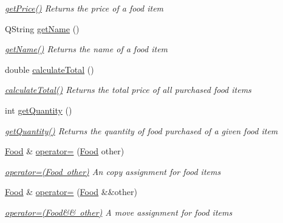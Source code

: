 \begin{DoxyCompactItemize}
\begin{DoxyCompactList}\small\item\em \mbox{\hyperlink{class_food_a16683d009125620dd07432fbe7711597}{get\+Price()}} Returns the price of a food item \end{DoxyCompactList}\item 
Q\+String \mbox{\hyperlink{class_food_a5652293c23e8b797d363c08efc585601}{get\+Name}} ()
\begin{DoxyCompactList}\small\item\em \mbox{\hyperlink{class_food_a5652293c23e8b797d363c08efc585601}{get\+Name()}} Returns the name of a food item \end{DoxyCompactList}\item 
double \mbox{\hyperlink{class_food_ac50c1e254e20ffeda0d28f84e1cc2160}{calculate\+Total}} ()
\begin{DoxyCompactList}\small\item\em \mbox{\hyperlink{class_food_ac50c1e254e20ffeda0d28f84e1cc2160}{calculate\+Total()}} Returns the total price of all purchased food items \end{DoxyCompactList}\item 
int \mbox{\hyperlink{class_food_ac05d435166d85ee4e7022e98f91f76d7}{get\+Quantity}} ()
\begin{DoxyCompactList}\small\item\em \mbox{\hyperlink{class_food_ac05d435166d85ee4e7022e98f91f76d7}{get\+Quantity()}} Returns the quantity of food purchased of a given food item \end{DoxyCompactList}\item 
\mbox{\hyperlink{class_food}{Food}} \& \mbox{\hyperlink{class_food_abe2267ba02f1b812c71028f427d92d81}{operator=}} (\mbox{\hyperlink{class_food}{Food}} other)
\begin{DoxyCompactList}\small\item\em \mbox{\hyperlink{class_food_abe2267ba02f1b812c71028f427d92d81}{operator=(\+Food other)}} An copy assignment for food items \end{DoxyCompactList}\item 
\mbox{\hyperlink{class_food}{Food}} \& \mbox{\hyperlink{class_food_a0ba9d6f416f396bc8e4a1c2ad519d3eb}{operator=}} (\mbox{\hyperlink{class_food}{Food}} \&\&other)
\begin{DoxyCompactList}\small\item\em \mbox{\hyperlink{class_food_a0ba9d6f416f396bc8e4a1c2ad519d3eb}{operator=(\+Food\&\& other)}} A move assignment for food items \end{DoxyCompactList}\item 

\end{DoxyCompactItemize}
